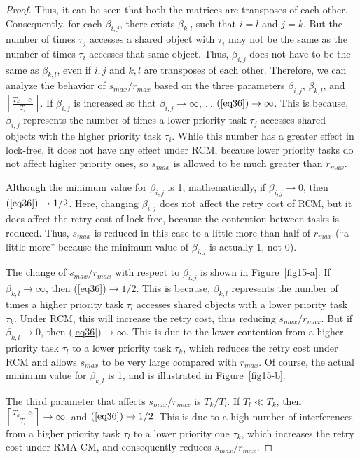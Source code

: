 \documentclass{sig-alternate}
\begin{document}
\begin{proof}
Thus, it can be seen that both the matrices are transposes of
each other. Consequently, for each $\beta_{i,j}$, there exists $\beta_{k,l}$
such that $i=l$ and $j=k$. But the number of times $\tau_{j}$ accesses
a shared object with $\tau_{i}$ may not be the same as the number of times
$\tau_{i}$ accesses that same object. Thus, $\beta_{i,j}$ does not have
to be the same as $\beta_{k,l}$, even if $i,j$ and $k,l$ are transposes 
of each other. Therefore, we can analyze the behavior of $s_{max}/r_{max}$ based on the three parameters $\beta_{i,j}$, $\beta_{k,l}$, and $\left\lceil\frac{T_{k}-c_{l}}{T_{l}}\right\rceil$.
If $\beta_{i,j}$ is increased so that $\beta_{i,j}\rightarrow\infty$,
$\therefore\,(\ref{eq36})\rightarrow\infty$.
This is because, $\beta_{i,j}$ represents the number of times a lower priority task $\tau_{j}$ accesses 
shared objects with the higher priority task $\tau_{i}$. 
While this number has a greater effect in lock-free, it does not have any effect under RCM, because lower priority tasks do not affect higher priority
ones, so $s_{max}$ is allowed to be much greater than $r_{max}$.

Although the minimum value for $\beta_{i,j}$ is 1, mathematically, if $\beta_{i,j}\rightarrow0$, then $(\ref{eq36})\rightarrow1/2$.
Here, changing $\beta_{i,j}$ does not affect the retry cost of RCM, but it does affect the retry cost of lock-free, because the contention between tasks is reduced. Thus, $s_{max}$ is reduced in this case to
a little more than half of $r_{max}$ (``a little more''
because the minimum value of $\beta_{i,j}$ is actually 1, not 0).


The change of $s_{max}/r_{max}$ with respect to $\beta_{i,j}$ is shown in Figure~\ref{fig15-a}.
If $\beta_{k,l}\rightarrow\infty$, then (\ref{eq36})$\rightarrow1/2$.
This is because, $\beta_{k,l}$ represents the number of times
a higher priority task $\tau_{l}$ accesses shared objects with a lower
priority task $\tau_{k}$. Under RCM, this will increase the retry 
cost, thus reducing $s_{max}/r_{max}$. But if $\beta_{k,l}\rightarrow0$, then (\ref{eq36})$\rightarrow\infty$. This is due to the lower contention from a higher priority task $\tau_{l}$ to a lower priority task $\tau_{k}$, which reduces the retry cost under RCM and allows $s_{max}$ to be very large compared with $r_{max}$. Of course, the actual minimum value for $\beta_{k,l}$ is 1, and is illustrated in Figure~\ref{fig15-b}.

The third parameter that affects $s_{max}/r_{max}$ is $T_{k}/T_{l}$.
If $T_{l}\ll T_{k}$, then $\left\lceil\frac{T_{k}-c_{l}}{T_{l}}\right\rceil\rightarrow\infty$,
and $(\ref{eq36})\rightarrow1/2$. This is due to a high number
of interferences from a higher priority task $\tau_{l}$ to a lower priority
one $\tau_{k}$, which increases the retry cost under RMA CM, and consequently reduces $s_{max}/r_{max}$. 


\end{proof}
\end{document}
